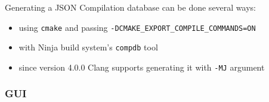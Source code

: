 \par Generating a JSON Compilation database can be done several ways: 
\begin{itemize}
	\item using \verb|cmake| and passing \verb|-DCMAKE_EXPORT_COMPILE_COMMANDS=ON|
	\item with Ninja build system's \verb|compdb| tool\cite{ninja_build_system}
	\item since version 4.0.0 Clang supports generating it with \verb|-MJ| argument\cite{clang_release_notes}
\end{itemize}
\subsubsection{GUI}
